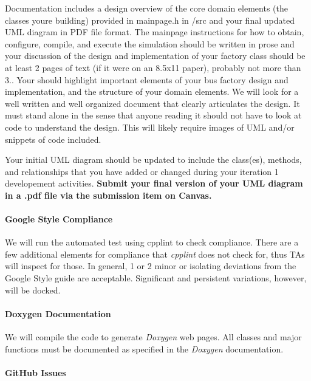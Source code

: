Documentation includes a design overview of the core domain elements (the classes you\textquotesingle{}re building) provided in mainpage.\+h in /src and your final updated U\+ML diagram in P\+DF file format. The mainpage instructions for how to obtain, configure, compile, and execute the simulation should be written in prose and your discussion of the design and implementation of your factory class should be at least 2 pages of text (if it were on an 8.\+5x11 paper), probably not more than 3.. Your should highlight important elements of your bus factory design and implementation, and the structure of your domain elements. We will look for a well written and well organized document that clearly articulates the design. It must stand alone in the sense that anyone reading it should not have to look at code to understand the design. This will likely require images of U\+ML and/or snippets of code included.

Your initial U\+ML diagram should be updated to include the class(es), methods, and relationships that you have added or changed during your iteration 1 developement activities. {\bfseries Submit your final version of your U\+ML diagram in a .pdf file via the submission item on Canvas.}

\paragraph*{Google Style Compliance}

We will run the automated test using \textquotesingle{}cpplint\textquotesingle{} to check compliance. There are a few additional elements for compliance that {\itshape cpplint} does not check for, thus T\+As will inspect for those. In general, 1 or 2 minor or isolating deviations from the Google Style guide are acceptable. Significant and persistent variations, however, will be docked.

\paragraph*{Doxygen Documentation}

We will compile the code to generate {\itshape Doxygen} web pages. All classes and major functions must be documented as specified in the {\itshape Doxygen} documentation.

\paragraph*{Git\+Hub Issues}

